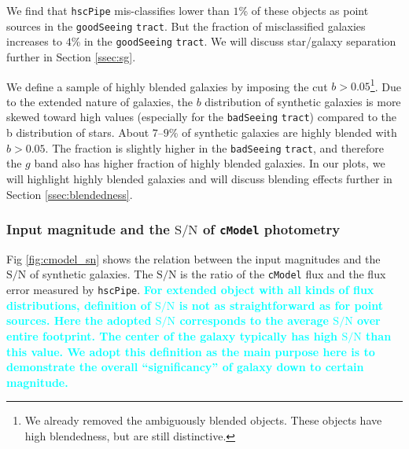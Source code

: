\documentclass[useamsfonts]{pasj01}
\def\hscpipe{\texttt{hscPipe}}
\def\cmodel{\texttt{cModel}}
\def\tract{\texttt{tract}}
\def\s2n{{$\mathrm{S}/\mathrm{N}$}}
\newcommand{\song}[1]{\textcolor{cyan} {\textbf{#1}}}
\begin{document}
    We find that \hscpipe{} mis-classifies lower than $1$\% of these objects as 
    point sources in the \texttt{goodSeeing} \tract{}.
    But the fraction of misclassified galaxies increases to $4$\% in the
    \texttt{goodSeeing} \tract{}. 
    We will discuss star/galaxy separation further in Section \ref{ssec:sg}.

    We define a sample of highly blended galaxies by imposing the cut 
    $b>0.05$\footnote{We already removed the ambiguously blended objects. 
    These objects have high blendedness, but are still distinctive.}.
    Due to the extended nature of galaxies, the $b$ distribution of synthetic 
    galaxies is more skewed toward high values (especially for the \texttt{badSeeing}
    \tract{}) compared to the b distribution of stars.
    About $7$--$9$\% of synthetic galaxies are highly blended with $b>0.05$.
    The fraction is slightly higher in the \texttt{badSeeing} \tract{}, and 
    therefore the $g$ band also has higher fraction of highly blended galaxies.
    In our plots, we will highlight highly blended galaxies and will discuss 
    blending effects further in Section \ref{ssec:blendedness}.

\subsubsection{Input magnitude and the \s2n{} of \cmodel{} photometry}

    Fig \ref{fig:cmodel_sn} shows the relation between the input magnitudes and the 
    \s2n{} of synthetic galaxies.  
    The \s2n{} is the ratio  of the \cmodel{} flux and the flux error measured by 
    \hscpipe{}.
    \song{
    For extended object with all kinds of flux distributions, definition of \s2n{} is 
    not as straightforward as for point sources.  
    Here the adopted \s2n{} corresponds to the average \s2n{} over entire footprint. 
    The center of the galaxy typically has high \s2n{} than this value.    
    We adopt this definition as the main purpose here is to demonstrate the overall 
    ``significancy'' of galaxy down to certain magnitude. 
    }
\end{document}
